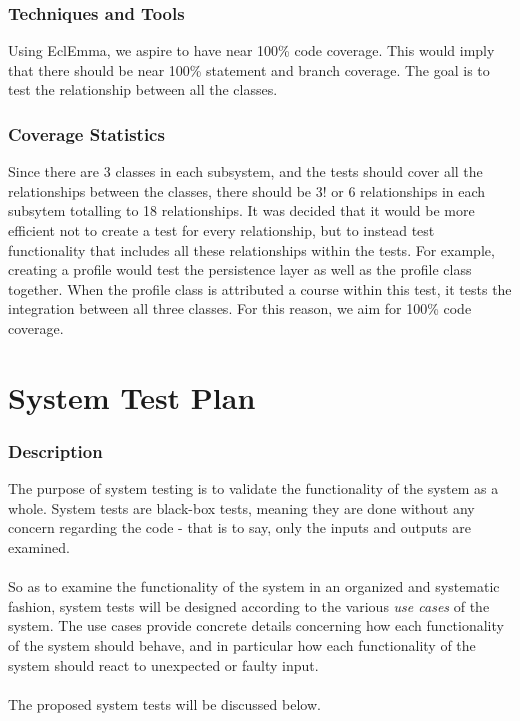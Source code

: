 \documentclass[12pt]{report}
\begin{document}
\section{Techniques and Tools}
Using EclEmma, we aspire to have near 100\% code coverage. This would imply that there should be
near 100\% statement and branch coverage. The goal is to test the relationship between all the classes.

\section{Coverage Statistics}
Since there are 3 classes in each subsystem, and the tests should cover all the relationships
between the classes, there should be 3! or 6 relationships in each subsytem totalling to 18
relationships. It was decided that it would be more efficient not to create a test for every relationship,
but to instead test functionality that includes all these relationships within the tests. For
example, creating a profile would test the persistence layer as well as the profile class together.
When the profile class is attributed a course within this test, it tests the integration between all
three classes. For this reason, we aim for 100\% code coverage.

\part{System Test Plan}
\section{Description}
The purpose of system testing is to validate the functionality of the system as a whole. System
tests are black-box tests, meaning they are done without any concern regarding the code - that is to
say, only the inputs and outputs are examined.\\\\
So as to examine the functionality of the system in an organized and systematic fashion, system
tests will be designed according to the various \textit{use cases} of the system. The use cases
provide concrete details concerning how each functionality of the system should behave, and in
particular how each functionality of the system should react to unexpected or faulty input.\\\\
The proposed system tests will be discussed below.
\end{document}
